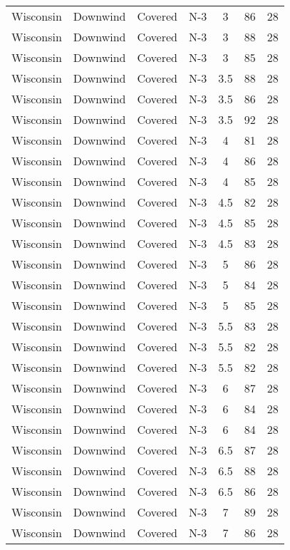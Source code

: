 \documentclass{article}
\begin{document}
\begin{longtable}[H]{ccccccc}
Wisconsin & Downwind & Covered     & N-3 & 3    & 86  & 28 \\
Wisconsin & Downwind & Covered     & N-3 & 3    & 88  & 28 \\
Wisconsin & Downwind & Covered     & N-3 & 3    & 85  & 28 \\
Wisconsin & Downwind & Covered     & N-3 & 3.5  & 88  & 28 \\
Wisconsin & Downwind & Covered     & N-3 & 3.5  & 86  & 28 \\
Wisconsin & Downwind & Covered     & N-3 & 3.5  & 92  & 28 \\
Wisconsin & Downwind & Covered     & N-3 & 4    & 81  & 28 \\
Wisconsin & Downwind & Covered     & N-3 & 4    & 86  & 28 \\
Wisconsin & Downwind & Covered     & N-3 & 4    & 85  & 28 \\
Wisconsin & Downwind & Covered     & N-3 & 4.5  & 82  & 28 \\
Wisconsin & Downwind & Covered     & N-3 & 4.5  & 85  & 28 \\
Wisconsin & Downwind & Covered     & N-3 & 4.5  & 83  & 28 \\
Wisconsin & Downwind & Covered     & N-3 & 5    & 86  & 28 \\
Wisconsin & Downwind & Covered     & N-3 & 5    & 84  & 28 \\
Wisconsin & Downwind & Covered     & N-3 & 5    & 85  & 28 \\
Wisconsin & Downwind & Covered     & N-3 & 5.5  & 83  & 28 \\
Wisconsin & Downwind & Covered     & N-3 & 5.5  & 82  & 28 \\
Wisconsin & Downwind & Covered     & N-3 & 5.5  & 82  & 28 \\
Wisconsin & Downwind & Covered     & N-3 & 6    & 87  & 28 \\
Wisconsin & Downwind & Covered     & N-3 & 6    & 84  & 28 \\
Wisconsin & Downwind & Covered     & N-3 & 6    & 84  & 28 \\
Wisconsin & Downwind & Covered     & N-3 & 6.5  & 87  & 28 \\
Wisconsin & Downwind & Covered     & N-3 & 6.5  & 88  & 28 \\
Wisconsin & Downwind & Covered     & N-3 & 6.5  & 86  & 28 \\
Wisconsin & Downwind & Covered     & N-3 & 7    & 89  & 28 \\
Wisconsin & Downwind & Covered     & N-3 & 7    & 86  & 28 \\

\end{longtable}
\end{document}
